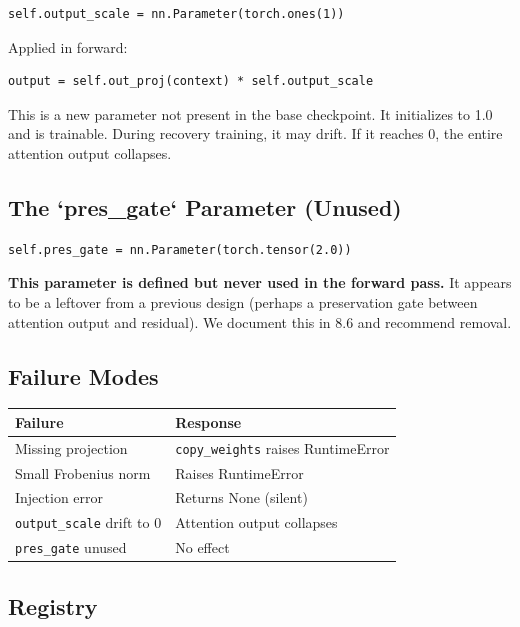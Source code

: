 \begin{lstlisting}
self.output_scale = nn.Parameter(torch.ones(1))
\end{lstlisting}

Applied in forward:

\begin{lstlisting}
output = self.out_proj(context) * self.output_scale
\end{lstlisting}

This is a new parameter not present in the base checkpoint. It 
initializes to 1.0 and is trainable. During recovery training, it 
may drift. If it reaches 0, the entire attention output collapses.

\subsection{The `pres\_gate` Parameter (Unused)}

\begin{lstlisting}
self.pres_gate = nn.Parameter(torch.tensor(2.0))
\end{lstlisting}

\textbf{This parameter is defined but never used in the forward pass.} It 
appears to be a leftover from a previous design (perhaps a preservation 
gate between attention output and residual). We document this in  8.6 
and recommend removal.

\subsection{Failure Modes}

\begin{table}[H]
\centering
\small
\begin{tabular}{ll}
\toprule
\textbf{Failure} & \textbf{Response} \\
\midrule
Missing projection & \texttt{copy\_weights} raises RuntimeError \\
Small Frobenius norm & Raises RuntimeError \\
Injection error & Returns None (silent) \\
\texttt{output\_scale} drift to 0 & Attention output collapses \\
\texttt{pres\_gate} unused & No effect \\
\bottomrule
\end{tabular}
\end{table}

\subsection{Registry}


